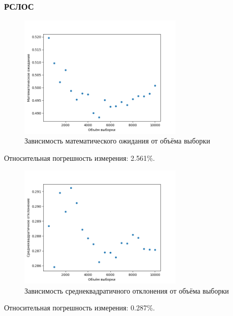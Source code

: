 \documentclass[bachelor, och, labwork]{SCWorks}
\begin{document}
\subsubsection{РСЛОС}
\begin{figure}[H]
  \centering
  \includegraphics[width=0.7\textwidth]{lfsr_me.png}
  \caption{Зависимость математического ожидания от объёма выборки}
\end{figure}
Относительная погрешность измерения: 2.561\%.

\begin{figure}[H]
  \centering
  \includegraphics[width=0.7\textwidth]{lfsr_st.png}
  \caption{Зависимость среднеквадратичного отклонения от объёма выборки}
\end{figure}
Относительная погрешность измерения: 0.287\%.
\end{document}
